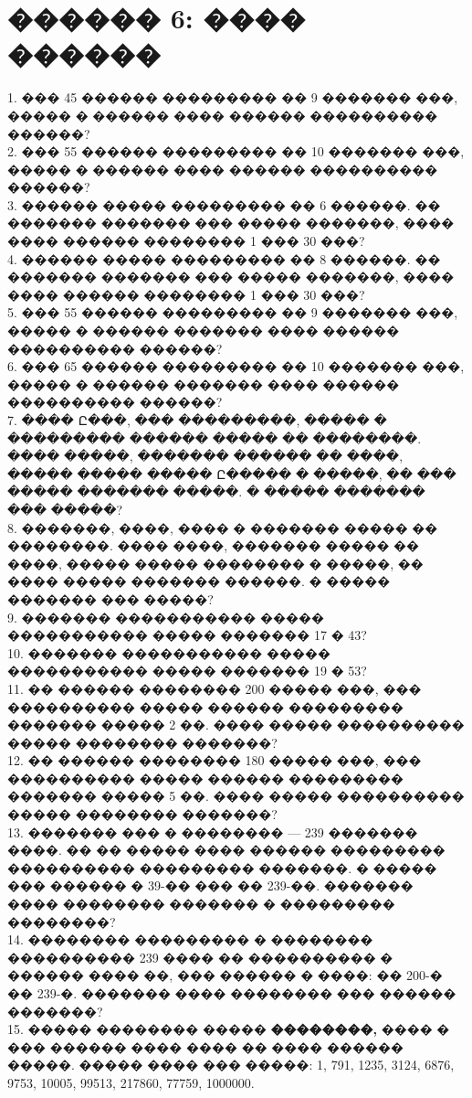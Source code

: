 \documentclass[12pt]{article}
\begin{document}
\section{������ 6: ���� ������}
1. ��� 45 ������ ��������� �� 9 ������� ���, ����� � ������ ���� ������ ���������� ������?\\
2. ��� 55 ������ ��������� �� 10 ������� ���, ����� � ������ ���� ������ ���������� ������?\\
3. ������ ����� ��������� �� 6 ������. �� ������� ������� ��� ����� �������, ���� ���� ������ �������� 1 ��� 30 ���?\\
4. ������ ����� ��������� �� 8 ������. �� ������� ������� ��� ����� �������, ���� ���� ������ �������� 1 ��� 30 ���?\\
5. ��� 55 ������ ��������� �� 9 ������� ���, ����� � ������ ������� ���� ������ ���������� ������?\\
6. ��� 65 ������ ��������� �� 10 ������� ���, ����� � ������ ������� ���� ������ ���������� ������?\\
7. ���� Ը���, ��� ���������, ����� � ��������� ������ ����� �� ��������. ���� �����, ������� ������ �� ����, ����� ����� ����� Ը����� � �����, �� ��� ����� ������� �����. � ����� ������� ��� �����?\\
8. �������, ����, ���� � ������� ����� �� ��������. ���� ����, ������� ����� �� ����, ����� ����� �������� � �����, �� ���� ����� ������� ������. � ����� ������� ��� �����?\\
9. ������� ����������� ����� ����������� ����� ������� 17 � 43?\\
10. ������� ����������� ����� ����������� ����� ������� 19 � 53?\\
11. �� ������ �������� 200 ����� ���, ��� ���������� ����� ������ ��������� ������� ����� 2 ��. ���� ����� ���������� ����� �������� �������?\\
12. �� ������ �������� 180 ����� ���, ��� ���������� ����� ������ ��������� ������� ����� 5 ��. ���� ����� ���������� ����� �������� �������?\\
13. ������� ��� � �������� --- 239 ������� ����. �� �� ����� ���� ������ ��������� ���������� ��������� �������. � ����� ��� ������ � 39-�� ��� �� 239-��. ������� ���� �������� ������� � ��������� ��������?\\
14. �������� ��������� � �������� ���������� 239 ���� �� ���������� � ������ ���� ��, ��� ������ � ����: �� 200-� �� 239-�. ������� ���� �������� ��� ������ �������?\\
15. ����� �������� ����� {\bf ��������,} ���� � ��� ������ ���� ���� �� ���� ������ �����. ����� ���� ��� �����: 1, 791, 1235, 3124, 6876, 9753, 10005, 99513, 217860, 77759, 1000000.\\
\end{document}
